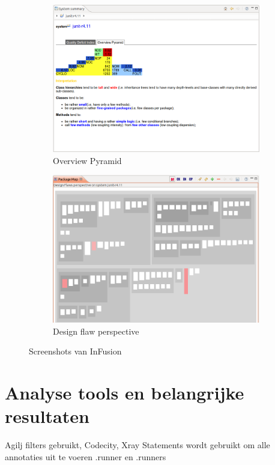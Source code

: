 \documentclass[i1]{oss}
\begin{document}
\begin{description}
\begin{figure}
\centering
	\begin{subfigure}[h]{0.65\textwidth}
		\centering
		\includegraphics[width=\textwidth]{InFusion1}
		\caption{Overview Pyramid}
	\end{subfigure}
	\begin{subfigure}[h]{0.65\textwidth}
		\centering
		\includegraphics[width=\textwidth]{InFusion2}
		\caption{Design flaw perspective}
	\end{subfigure}
\caption{Screenshots van InFusion}
\label{fig:InFusion}
\end{figure}


\end{description}


\section{Analyse tools en belangrijke resultaten}
Agilj filters gebruikt, Codecity, Xray
Statements wordt gebruikt om alle annotaties uit te voeren
.runner en .runners
\end{document}
